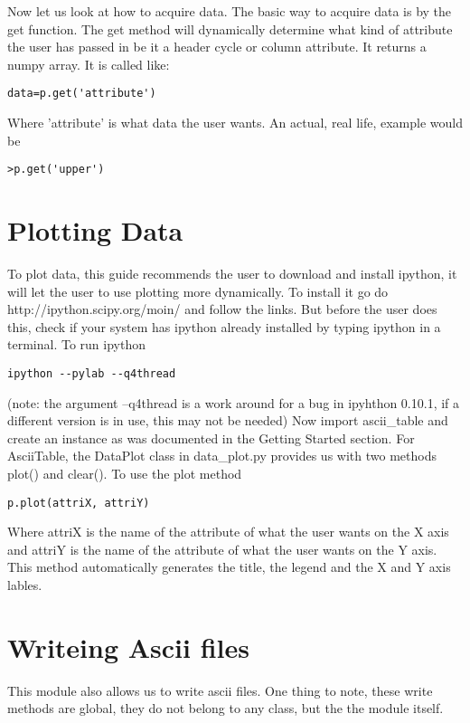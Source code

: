 Now let us look at how to acquire data.
\newline
The basic way to acquire data is by the get function. The get method will dynamically determine what kind of attribute the user has passed in
be it a header cycle or column attribute.  It returns a numpy array.  It is called like:
\begin{verbatim}
data=p.get('attribute')
\end{verbatim}
Where 'attribute' is what data the user wants.
An actual, real life, example would be
\begin{verbatim}
>p.get('upper')
\end{verbatim}

\section{Plotting Data}
To plot data, this guide recommends the user to download and install ipython, it will let the user to use plotting more dynamically. To install it go do http://ipython.scipy.org/moin/ and follow the links.
But before the user does this, check if your system has ipython already installed by typing ipython in a terminal.
\newline
To run ipython
\begin{verbatim}
ipython --pylab --q4thread
\end{verbatim}
(note: the argument --q4thread is a work around for a bug in ipyhthon 0.10.1, if a different version is in use, this may not be needed)
\newline
Now import ascii\_table and create an instance as was documented in the Getting Started section.
For AsciiTable, the DataPlot class in  data\_plot.py provides us with two methods plot() and clear().
\newline
To use the plot method
\begin{verbatim}
p.plot(attriX, attriY)
\end{verbatim}
Where attriX is the name of the attribute of what the user wants on the X axis and attriY is the name of the attribute of what the user wants on the Y axis.
This method automatically generates the title, the legend and the X and Y axis lables.

\section{Writeing Ascii files}
This module also allows us to write ascii files. One thing to note, these write 
methods are global, they do not belong to any class, but the the module itself.
